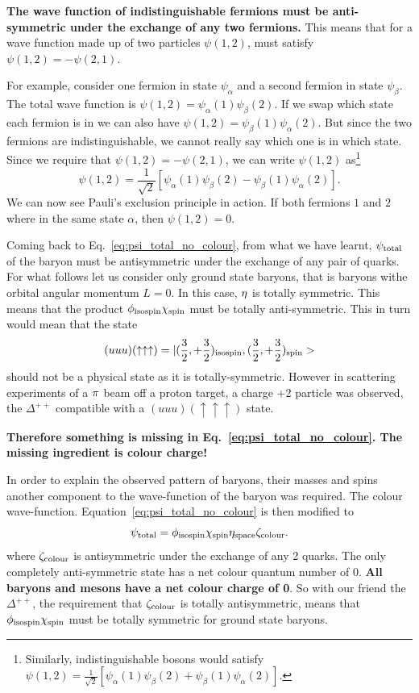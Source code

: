{\bf The wave function of indistinguishable fermions must be anti-symmetric under the exchange of any two fermions.}
This means that for a wave function made up of two particles $\psi(1,2)$, must satisfy $\psi(1,2)=-\psi(2,1)$.

For example, consider one fermion in state $\psi_\alpha$ and a second fermion in state $\psi_\beta$. The total wave function is $\psi(1,2)=\psi_\alpha(1)\psi_\beta(2)$. If we swap which state each fermion is in we can also have $\psi(1,2)=\psi_\beta(1)\psi_\alpha(2)$. But since the two fermions are indistinguishable, we cannot really say which one is in which state.
Since we require that $\psi(1,2)=-\psi(2,1)$, we can write $\psi(1,2)$ as\footnote{Similarly, indistinguishable bosons would satisfy
$\psi(1,2)=\frac{1}{\sqrt{2}}[ \psi_\alpha(1)\psi_\beta(2)+\psi_\beta(1)\psi_\alpha(2)]$.
}
\[
\psi(1,2)=\frac{1}{\sqrt{2}}[ \psi_\alpha(1)\psi_\beta(2)-\psi_\beta(1)\psi_\alpha(2) ].
\]
We can now see Pauli's exclusion principle in action. If both fermions $1$ and $2$ where in the same state $\alpha$, then  $\psi(1,2)=0$.

Coming back to Eq.~\ref{eq:psi_total_no_colour}, from what we have learnt, $\psi_{\rm total}$ of the baryon must be antisymmetric under the exchange of any pair of quarks. For what follows let us consider only ground state baryons, that is baryons withe orbital angular momentum $L=0$. In this case, $\eta_{\space}$ is totally symmetric. This means that the product $\phi_{\rm isospin}\chi_{\rm spin}$ must be totally anti-symmetric. This in turn would mean that the state
\[
(uuu)(\uparrow\uparrow\uparrow)=|(\frac{3}{2},+\frac{3}{2})_{\rm isospin},(\frac{3}{2},+\frac{3}{2})_{\rm spin}>
\]
should not be a physical state as it is totally-symmetric. However in scattering
experiments of a ${\rm \pi}$ beam off a proton target, a charge +2 particle was observed, the $\Delta^{++}$ compatible with a $(uuu)(\uparrow\uparrow\uparrow)$ state.



{\bf Therefore something is missing in Eq.~\ref{eq:psi_total_no_colour}. The missing ingredient is colour charge!}

In order to explain the observed pattern of baryons, their masses and spins another component to the wave-function of the baryon was required. The colour wave-function. Equation~\ref{eq:psi_total_no_colour} is then modified to
\begin{equation}
\label{eq:psi_total_colour}
\psi_{\rm total}=\phi_{\rm isospin}\chi_{\rm spin}\eta_{\rm space}\zeta_{\rm colour}.
\end{equation}
where $\zeta_{\rm colour}$ is antisymmetric under the exchange of any 2 quarks. 
The only completely anti-symmetric state has a net colour quantum number of 0.
{\bf All baryons and mesons have a net colour charge of 0}. 
So with our friend the $\Delta^{++}$, the requirement that $\zeta_{\rm colour}$ is totally antisymmetric, means that $\phi_{\rm isospin}\chi_{\rm spin}$ must be totally symmetric for ground state baryons.

